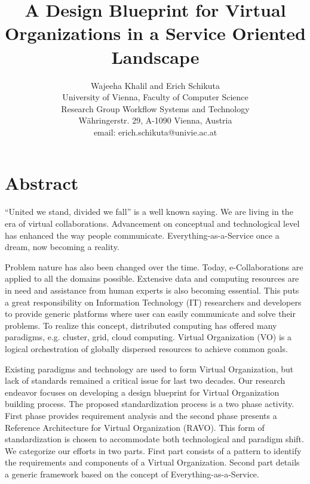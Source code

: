 \documentclass[]{article}
\begin{document}
\title{A Design Blueprint for Virtual Organizations in a Service Oriented Landscape}
\author{Wajeeha Khalil and Erich Schikuta\\
  University of Vienna, Faculty of Computer Science \\
  Research Group Workflow Systems and Technology \\
  W\"ahringerstr. 29, A-1090 Vienna, Austria\\
  email: erich.schikuta@univie.ac.at}





\date{}

\maketitle

\section*{Abstract}

``United we stand, divided we fall'' is a well known saying. We are living in the era of virtual collaborations. Advancement on conceptual and technological level has enhanced the way people communicate. Everything-as-a-Service once a dream, now becoming a reality.

Problem nature has also been changed over the time. Today, e-Collaborations are applied to all the domains possible. Extensive data and computing resources are in need and assistance  from human experts is also becoming essential. This puts a great responsibility on Information Technology (IT) researchers and developers to provide generic platforms where user can easily communicate and solve their problems. To realize this concept, distributed computing has offered many paradigms, e.g. cluster, grid, cloud computing. Virtual Organization (VO) is a logical orchestration of globally dispersed resources to achieve common goals.

Existing paradigms and technology are used to form Virtual Organization, but lack of standards remained a critical issue for last two decades. Our research endeavor focuses on developing a design blueprint for Virtual Organization building process. The proposed standardization process is a two phase activity. First phase provides requirement analysis and the second phase presents a Reference Architecture for Virtual Organization (RAVO). This form of standardization is chosen to accommodate both technological and paradigm shift. We categorize our efforts in two parts. First part consists of a pattern to identify the requirements and components of a Virtual Organization. Second part details a generic framework based on the concept of Everything-as-a-Service.
\end{document}

